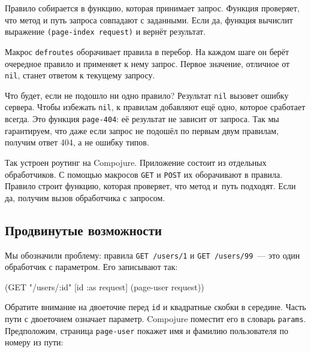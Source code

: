 
Правило собирается в функцию, которая принимает запрос. Функция проверяет, что
метод и путь запроса совпадают с заданными. Если да, функция вычислит выражение
\verb|(page-index request)| и вернёт результат.

Макрос \verb|defroutes| оборачивает правила в перебор. На каждом шаге он берёт
очередное правило и применяет к нему запрос. Первое значение, отличное от
\verb|nil|, станет ответом к текущему запросу.

Что будет, если не подошло ни одно правило? Результат \verb|nil| вызовет
ошибку сервера. Чтобы избежать \verb|nil|, к правилам добавляют ещё одно,
которое сработает всегда. Это функция \verb|page-404|: её результат не
зависит от запроса. Так мы гарантируем, что даже если запрос не подошёл по первым
двум правилам, получим ответ 404, а не ошибку типов.

Так устроен роутинг на Compojure. Приложение состоит из отдельных
обработчиков. С помощью макросов \verb|GET| и \verb|POST| их оборачивают в
правила. Правило строит функцию, которая проверяет, что метод и~путь
подходят. Если да, получим вызов обработчика с запросом.

\subsection{Продвинутые возможности}

Мы обозначили проблему: правила \verb|GET /users/1| и \verb|GET /users/99|~---
это один обработчик с параметром. Его записывают так:



\begin{english}
  \begin{clojure}
(GET "/users/:id" [id :as request] (page-user request))
  \end{clojure}
\end{english}

Обратите внимание на двоеточие перед \verb|id| и квадратные скобки в середине.
Часть пути с двоеточием означает параметр. Compojure поместит его в словарь
\verb|params|. Предположим, страница \verb|page-user| покажет имя и фамилию
пользователя по номеру из пути:

\begin{english}
\end{english}

